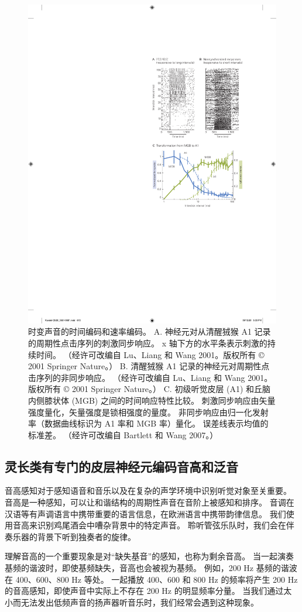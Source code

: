 \begin{figure}[htbp]
	\centering
	\includegraphics[width=0.5\linewidth]{chap28/fig_28_12}
	\caption{时变声音的时间编码和速率编码。
	A. 神经元对从清醒狨猴 A1 记录的周期性点击序列的刺激同步响应。 x 轴下方的水平条表示刺激的持续时间。 （经许可改编自 Lu、Liang 和 Wang 2001。版权所有 © 2001 Springer Nature。）
	B. 清醒狨猴 A1 记录的神经元对周期性点击序列的非同步响应。 （经许可改编自 Lu、Liang 和 Wang 2001。版权所有 © 2001 Springer Nature。） 
	C. 初级听觉皮层 (A1) 和丘脑内侧膝状体 (MGB) 之间的时间响应特性比较。 刺激同步响应由矢量强度量化，矢量强度是锁相强度的量度。 非同步响应由归一化发射率（数据曲线标识为 A1 率和 MGB 率）量化。 误差线表示均值的标准差。 （经许可改编自 Bartlett 和 Wang 2007。）}
	\label{fig:28_12}
\end{figure}

\subsection{灵长类有专门的皮层神经元编码音高和泛音}
音高感知对于感知语音和音乐以及在复杂的声学环境中识别听觉对象至关重要。 音高是一种感知，可以让和谐结构的周期性声音在音阶上被感知和排序。 音调在汉语等有声调语言中携带重要的语言信息，在欧洲语言中携带韵律信息。 我们使用音高来识别鸡尾酒会中嘈杂背景中的特定声音。 聆听管弦乐队时，我们会在伴奏乐器的背景下听到独奏者的旋律。

理解音高的一个重要现象是对“缺失基音”的感知，也称为剩余音高。 当一起演奏基频的谐波时，即使基频缺失，音高也会被视为基频。 例如，200 Hz 基频的谐波在 400、600、800 Hz 等处。 一起播放 400、600 和 800 Hz 的频率将产生 200 Hz 的音高感知，即使声音中实际上不存在 200 Hz 的明显频率分量。 当我们通过太小而无法发出低频声音的扬声器听音乐时，我们经常会遇到这种现象。

